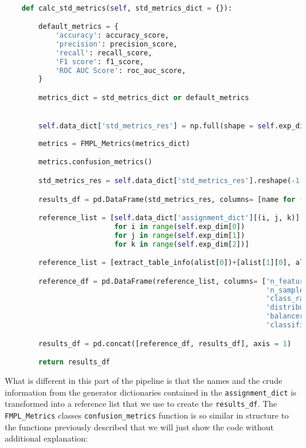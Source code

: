 \begin{lstlisting}[language=Python, numbers=none]

    def calc_std_metrics(self, std_metrics_dict = {}):

        default_metrics = {
            'accuracy': accuracy_score,
            'precision': precision_score,
            'recall': recall_score,
            'F1 score': f1_score,
            'ROC AUC Score': roc_auc_score,
        }

        metrics_dict = std_metrics_dict or default_metrics


        self.data_dict['std_metrics_res'] = np.full(shape = self.exp_dim + (len(metrics_dict),), fill_value = np.nan)
        
        metrics = FMPL_Metrics(metrics_dict)

        metrics.confusion_metrics()

        std_metrics_res = self.data_dict['std_metrics_res'].reshape(-1, len(metrics_dict))

        results_df = pd.DataFrame(std_metrics_res, columns= [name for (name, metr_func) in metrics.std_metric_list])

        reference_list = [self.data_dict['assignment_dict'][(i, j, k)] 
                          for i in range(self.exp_dim[0]) 
                          for j in range(self.exp_dim[1]) 
                          for k in range(self.exp_dim[2])]

        reference_list = [extract_table_info(alist[0])+[alist[1][0], alist[2][0]] for alist in reference_list]

        reference_df = pd.DataFrame(reference_list, columns= ['n_features', 
                                                              'n_samples', 
                                                              'class_ratio', 
                                                              'distributions', 
                                                              'balancer', 
                                                              'classifier'])

        results_df = pd.concat([reference_df, results_df], axis = 1)

        return results_df
\end{lstlisting}

What is different in this part of the pipeline is that the names and the crude information from the generator dictionaries contained in the \texttt{assignment\_dict}
is transformed into a reference list that we use to create the \texttt{results\_df}.
The \texttt{FMPL\_Metrics} classes \texttt{confusion\_metrics} function is so similar in structure to the functions previously described 
that we will just show the code without additional explanation:


